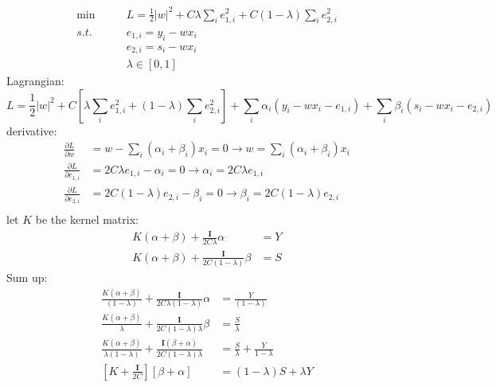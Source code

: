 \begin{equation}
\begin{aligned}
\min \qquad & L = \frac{1}{2}{\left| w \right|^2} + C \lambda \sum\limits_i {e_{1,i}^2}  + C \left( {1 - \lambda } \right)\sum\limits_i {e_{2,i}^2} \\
s.t.\qquad& e_{1,i} = y_i - wx_i\\
& e_{2,i} = s_i - wx_i\\
& \lambda \in [0,1]
\end{aligned}  
\end{equation}
Lagrangian:
\begin{equation}
L = \frac{1}{2}{\left| w \right|^2} + C[\lambda \sum\limits_i {e_{1,i}^2}  + \left( {1 - \lambda } \right)\sum\limits_i {e_{2,i}^2}]  + \sum\limits_i {{\alpha _i}\left( {y_i - wx_i - {e_{1,i}}} \right)}  + \sum\limits_i {{\beta _i}\left( {s_i - wx_i - {e_{2,i}}} \right)} 
\end{equation}
derivative:
\begin{equation}
\begin{aligned}
\frac{{\partial L}}{{\partial w}}& = w - \sum\limits_i {\left( {{\alpha _i} + {\beta _i}} \right)} {x_i}=0 \rightarrow w = \sum\limits_i {\left( {{\alpha _i} + {\beta _i}} \right)} {x_i}\\
\frac{{\partial L}}{{\partial {e_{1,i}}}} & = 2C\lambda {e_{1,i}} - {\alpha _i}=0 \rightarrow \alpha_i = 2C\lambda {e_{1,i}}\\
\frac{{\partial L}}{{\partial {e_{2,i}}}}&= 2C\left( {1 - \lambda } \right){e_{2,i}} - {\beta _i}=0 \rightarrow \beta_i = 2C(1-\lambda)e_{2,i}\\
\end{aligned}
\end{equation}
let $K$ be the kernel matrix:
\begin{equation}
\begin{aligned}
K(\alpha+\beta)+\frac{\mathbf{I}}{2C\lambda}\alpha&=Y\\
K(\alpha+\beta)+\frac{\mathbf{I}}{2C(1-\lambda)}\beta&=S
\end{aligned}
\end{equation}
Sum up:
\begin{equation}
\begin{aligned}
\frac{K(\alpha+\beta)}{(1-\lambda)}+\frac{\mathbf{I}}{2C\lambda(1-\lambda)}\alpha&=\frac{Y}{(1-\lambda) }\\
\frac{K(\alpha+\beta)}{\lambda}+\frac{\mathbf{I}}{2C (1-\lambda)\lambda}\beta&=\frac{S}{\lambda}\\
\frac{K(\alpha+\beta)}{\lambda(1-\lambda)}+\frac{\mathbf{I}(\beta+\alpha)}{2C(1-\lambda)\lambda}&=\frac{S}{\lambda}+\frac{Y}{1-\lambda}\\
[K+\frac{\mathbf{I}}{2C}][\beta+\alpha]&=(1-\lambda)S+\lambda Y
\end{aligned}
\end{equation}
